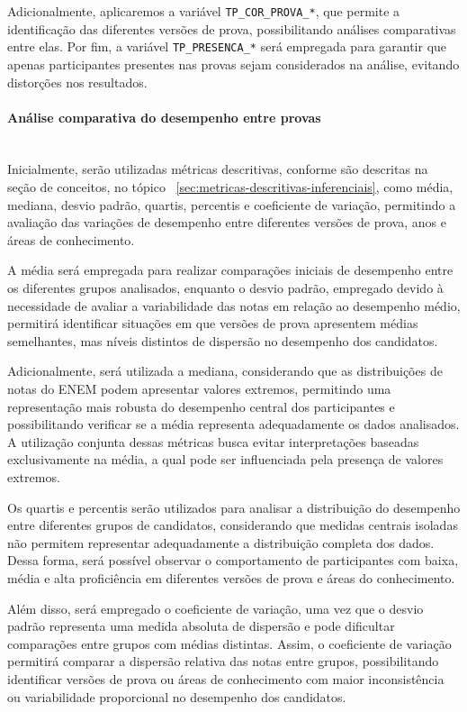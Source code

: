 \documentclass[a4paper,10pt, twocolumn]{article}
\begin{document}
Adicionalmente, aplicaremos a variável \texttt{TP\_COR\_PROVA\_*}, que permite a identificação das diferentes versões de prova, possibilitando análises comparativas entre elas. Por fim, a variável \texttt{TP\_PRESENCA\_*} será empregada para garantir que apenas participantes presentes nas provas sejam considerados na análise, evitando distorções nos resultados.

\paragraph{Análise comparativa do desempenho entre provas}
\mbox{}\\

Inicialmente, serão utilizadas métricas descritivas, conforme são descritas na seção de conceitos, no tópico ~\ref{sec:metricas-descritivas-inferenciais}, como média, mediana, desvio padrão, quartis, percentis e coeficiente de variação, permitindo a avaliação das variações de desempenho entre diferentes versões de prova, anos e áreas de conhecimento.

A média será empregada para realizar comparações iniciais de desempenho entre os diferentes grupos analisados, enquanto o desvio padrão, empregado devido à necessidade de avaliar a variabilidade das notas em relação ao desempenho médio, permitirá identificar situações em que versões de prova apresentem médias semelhantes, mas níveis distintos de dispersão no desempenho dos candidatos.

Adicionalmente, será utilizada a mediana, considerando que as distribuições de notas do ENEM podem apresentar valores extremos, permitindo uma representação mais robusta do desempenho central dos participantes e possibilitando verificar se a média representa adequadamente os dados analisados. A utilização conjunta dessas métricas busca evitar interpretações baseadas exclusivamente na média, a qual pode ser influenciada pela presença de valores extremos.

Os quartis e percentis serão utilizados para analisar a distribuição do desempenho entre diferentes grupos de candidatos, considerando que medidas centrais isoladas não permitem representar adequadamente a distribuição completa dos dados. Dessa forma, será possível observar o comportamento de participantes com baixa, média e alta proficiência em diferentes versões de prova e áreas do conhecimento.

Além disso, será empregado o coeficiente de variação, uma vez que o desvio padrão representa uma medida absoluta de dispersão e pode dificultar comparações entre grupos com médias distintas. Assim, o coeficiente de variação permitirá comparar a dispersão relativa das notas entre grupos, possibilitando identificar versões de prova ou áreas de conhecimento com maior inconsistência ou variabilidade proporcional no desempenho dos candidatos.
\end{document}
